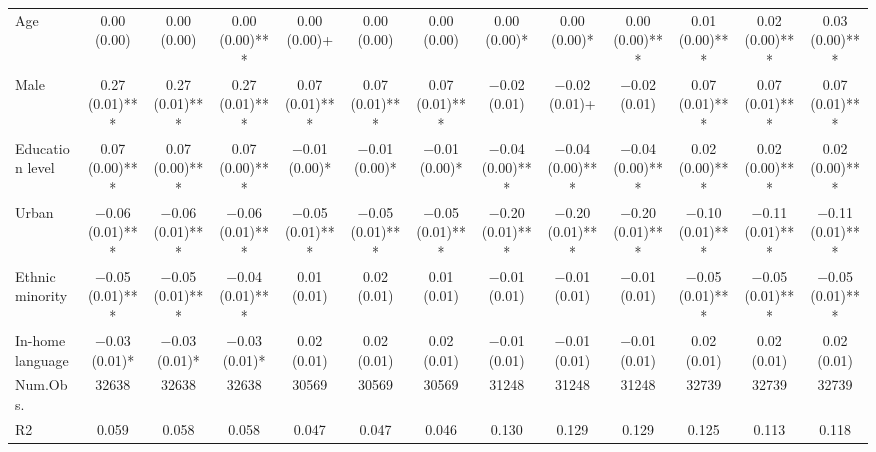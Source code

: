 \begin{table}
\begin{tabular}[t]{lcccccccccccc}
Age & \num{0.00} (\num{0.00}) & \num{0.00} (\num{0.00}) & \num{0.00} (\num{0.00})*** & \num{0.00} (\num{0.00})+ & \num{0.00} (\num{0.00}) & \num{0.00} (\num{0.00}) & \num{0.00} (\num{0.00})* & \num{0.00} (\num{0.00})* & \num{0.00} (\num{0.00})*** & \num{0.01} (\num{0.00})*** & \num{0.02} (\num{0.00})*** & \num{0.03} (\num{0.00})***\\
Male & \num{0.27} (\num{0.01})*** & \num{0.27} (\num{0.01})*** & \num{0.27} (\num{0.01})*** & \num{0.07} (\num{0.01})*** & \num{0.07} (\num{0.01})*** & \num{0.07} (\num{0.01})*** & \num{-0.02} (\num{0.01}) & \num{-0.02} (\num{0.01})+ & \num{-0.02} (\num{0.01}) & \num{0.07} (\num{0.01})*** & \num{0.07} (\num{0.01})*** & \num{0.07} (\num{0.01})***\\
Education level & \num{0.07} (\num{0.00})*** & \num{0.07} (\num{0.00})*** & \num{0.07} (\num{0.00})*** & \num{-0.01} (\num{0.00})* & \num{-0.01} (\num{0.00})* & \num{-0.01} (\num{0.00})* & \num{-0.04} (\num{0.00})*** & \num{-0.04} (\num{0.00})*** & \num{-0.04} (\num{0.00})*** & \num{0.02} (\num{0.00})*** & \num{0.02} (\num{0.00})*** & \num{0.02} (\num{0.00})***\\
Urban & \num{-0.06} (\num{0.01})*** & \num{-0.06} (\num{0.01})*** & \num{-0.06} (\num{0.01})*** & \num{-0.05} (\num{0.01})*** & \num{-0.05} (\num{0.01})*** & \num{-0.05} (\num{0.01})*** & \num{-0.20} (\num{0.01})*** & \num{-0.20} (\num{0.01})*** & \num{-0.20} (\num{0.01})*** & \num{-0.10} (\num{0.01})*** & \num{-0.11} (\num{0.01})*** & \num{-0.11} (\num{0.01})***\\
Ethnic minority & \num{-0.05} (\num{0.01})*** & \num{-0.05} (\num{0.01})*** & \num{-0.04} (\num{0.01})*** & \num{0.01} (\num{0.01}) & \num{0.02} (\num{0.01}) & \num{0.01} (\num{0.01}) & \num{-0.01} (\num{0.01}) & \num{-0.01} (\num{0.01}) & \num{-0.01} (\num{0.01}) & \num{-0.05} (\num{0.01})*** & \num{-0.05} (\num{0.01})*** & \num{-0.05} (\num{0.01})***\\
In-home language & \num{-0.03} (\num{0.01})* & \num{-0.03} (\num{0.01})* & \num{-0.03} (\num{0.01})* & \num{0.02} (\num{0.01}) & \num{0.02} (\num{0.01}) & \num{0.02} (\num{0.01}) & \num{-0.01} (\num{0.01}) & \num{-0.01} (\num{0.01}) & \num{-0.01} (\num{0.01}) & \num{0.02} (\num{0.01}) & \num{0.02} (\num{0.01}) & \num{0.02} (\num{0.01})\\
\midrule
Num.Obs. & \num{32638} & \num{32638} & \num{32638} & \num{30569} & \num{30569} & \num{30569} & \num{31248} & \num{31248} & \num{31248} & \num{32739} & \num{32739} & \num{32739}\\
R2 & \num{0.059} & \num{0.058} & \num{0.058} & \num{0.047} & \num{0.047} & \num{0.046} & \num{0.130} & \num{0.129} & \num{0.129} & \num{0.125} & \num{0.113} & \num{0.118}\\

\end{tabular}
\end{table}
